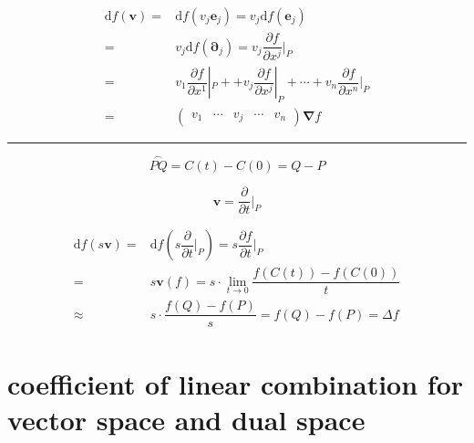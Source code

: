 \documentclass[
]{book}
\theoremstyle{definition}
\theoremstyle{definition}
\theoremstyle{definition}
\theoremstyle{definition}
\theoremstyle{remark}
\begin{document}
\[
\begin{aligned}
\mathrm{d}f\left(\boldsymbol{v}\right)= & \mathrm{d}f\left(v_{{\scriptscriptstyle j}}\boldsymbol{e}_{{\scriptscriptstyle j}}\right)=v_{{\scriptscriptstyle j}}\mathrm{d}f\left(\boldsymbol{e}_{{\scriptscriptstyle j}}\right)\\
= & v_{{\scriptscriptstyle j}}\mathrm{d}f\left(\boldsymbol{\partial}_{{\scriptscriptstyle j}}\right)=v_{{\scriptscriptstyle j}}\dfrac{\partial f}{\partial x^{{\scriptscriptstyle j}}}|_{{\scriptscriptstyle P}}\\
= & v_{{\scriptscriptstyle 1}}\dfrac{\partial f}{\partial x^{{\scriptscriptstyle 1}}}|_{{\scriptscriptstyle P}}++v_{{\scriptscriptstyle j}}\dfrac{\partial f}{\partial x^{{\scriptscriptstyle j}}}|_{{\scriptscriptstyle P}}+\cdots+v_{{\scriptscriptstyle n}}\dfrac{\partial f}{\partial x^{{\scriptscriptstyle n}}}|_{{\scriptscriptstyle P}}\\
= & \begin{pmatrix}v_{{\scriptscriptstyle 1}} & \cdots & v_{{\scriptscriptstyle j}} & \cdots & v_{{\scriptscriptstyle n}}\end{pmatrix}\boldsymbol{\nabla}f
\end{aligned}
\]

\begin{center}\rule{0.5\linewidth}{0.5pt}\end{center}

\[
\overset{\frown}{PQ}=C\left(t\right)-C\left(0\right)=Q-P
\]

\[
\boldsymbol{v}=\dfrac{\partial}{\partial t}|_{{\scriptscriptstyle P}}
\]

\[
\begin{aligned}
\mathrm{d}f\left(s\boldsymbol{v}\right)= & \mathrm{d}f\left(s\dfrac{\partial}{\partial t}|_{{\scriptscriptstyle P}}\right)=s\dfrac{\partial f}{\partial t}|_{{\scriptscriptstyle P}}\\
= & s\boldsymbol{v}\left(f\right)=s\cdot\lim_{t\rightarrow0}\dfrac{f\left(C\left(t\right)\right)-f\left(C\left(0\right)\right)}{t}\\
\approx & s\cdot\dfrac{f\left(Q\right)-f\left(P\right)}{s}=f\left(Q\right)-f\left(P\right)=\Delta f
\end{aligned}
\]

\section{coefficient of linear combination for vector space and dual space}\label{coefficient-of-linear-combination-for-vector-space-and-dual-space}
\end{document}
